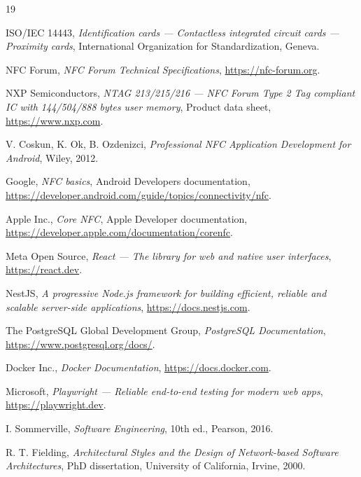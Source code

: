 \documentclass[12pt,a4paper]{report}
\begin{document}
\begin{thebibliography}{19}

ISO/IEC 14443, \textit{Identification cards --- Contactless integrated circuit
cards --- Proximity cards}, International Organization for Standardization,
Geneva.

NFC Forum, \textit{NFC Forum Technical Specifications},
\url{https://nfc-forum.org}.

NXP Semiconductors, \textit{NTAG 213/215/216 --- NFC Forum Type 2 Tag compliant
IC with 144/504/888 bytes user memory}, Product data sheet,
\url{https://www.nxp.com}.

V. Coskun, K. Ok, B. Ozdenizci, \textit{Professional NFC Application
Development for Android}, Wiley, 2012.

Google, \textit{NFC basics}, Android Developers documentation,
\url{https://developer.android.com/guide/topics/connectivity/nfc}.

Apple Inc., \textit{Core NFC}, Apple Developer documentation,
\url{https://developer.apple.com/documentation/corenfc}.

Meta Open Source, \textit{React --- The library for web and native user
interfaces}, \url{https://react.dev}.

NestJS, \textit{A progressive Node.js framework for building efficient,
reliable and scalable server-side applications}, \url{https://docs.nestjs.com}.

The PostgreSQL Global Development Group, \textit{PostgreSQL Documentation},
\url{https://www.postgresql.org/docs/}.

Docker Inc., \textit{Docker Documentation}, \url{https://docs.docker.com}.

Microsoft, \textit{Playwright --- Reliable end-to-end testing for modern web
apps}, \url{https://playwright.dev}.

I. Sommerville, \textit{Software Engineering}, 10th ed., Pearson, 2016.

R. T. Fielding, \textit{Architectural Styles and the Design of
Network-based Software Architectures}, PhD dissertation, University of
California, Irvine, 2000.


\end{thebibliography}
\end{document}
